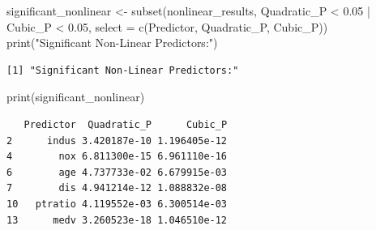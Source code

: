 \documentclass[
]{article}
\newenvironment{Shaded}{\begin{snugshade}}{\end{snugshade}}
\newcommand{\AttributeTok}[1]{\textcolor[rgb]{0.40,0.45,0.13}{#1}}
\newcommand{\ConstantTok}[1]{\textcolor[rgb]{0.56,0.35,0.01}{#1}}
\newcommand{\ControlFlowTok}[1]{\textcolor[rgb]{0.00,0.23,0.31}{#1}}
\newcommand{\DecValTok}[1]{\textcolor[rgb]{0.68,0.00,0.00}{#1}}
\newcommand{\FloatTok}[1]{\textcolor[rgb]{0.68,0.00,0.00}{#1}}
\newcommand{\FunctionTok}[1]{\textcolor[rgb]{0.28,0.35,0.67}{#1}}
\newcommand{\NormalTok}[1]{\textcolor[rgb]{0.00,0.23,0.31}{#1}}
\newcommand{\OtherTok}[1]{\textcolor[rgb]{0.00,0.23,0.31}{#1}}
\newcommand{\SpecialCharTok}[1]{\textcolor[rgb]{0.37,0.37,0.37}{#1}}
\newcommand{\StringTok}[1]{\textcolor[rgb]{0.13,0.47,0.30}{#1}}
\begin{document}
\begin{Shaded}
\begin{Highlighting}[]
\NormalTok{significant\_nonlinear }\OtherTok{\textless{}{-}} \FunctionTok{subset}\NormalTok{(nonlinear\_results, Quadratic\_P }\SpecialCharTok{\textless{}} \FloatTok{0.05} \SpecialCharTok{|}\NormalTok{ Cubic\_P }\SpecialCharTok{\textless{}} \FloatTok{0.05}\NormalTok{, }\AttributeTok{select =} \FunctionTok{c}\NormalTok{(Predictor, Quadratic\_P, Cubic\_P))}
\FunctionTok{print}\NormalTok{(}\StringTok{"Significant Non{-}Linear Predictors:"}\NormalTok{)}
\end{Highlighting}
\end{Shaded}

\begin{verbatim}
[1] "Significant Non-Linear Predictors:"
\end{verbatim}

\begin{Shaded}
\begin{Highlighting}[]
\FunctionTok{print}\NormalTok{(significant\_nonlinear)}
\end{Highlighting}
\end{Shaded}

\begin{verbatim}
   Predictor  Quadratic_P      Cubic_P
2      indus 3.420187e-10 1.196405e-12
4        nox 6.811300e-15 6.961110e-16
6        age 4.737733e-02 6.679915e-03
7        dis 4.941214e-12 1.088832e-08
10   ptratio 4.119552e-03 6.300514e-03
13      medv 3.260523e-18 1.046510e-12
\end{verbatim}

\begin{Shaded}
\end{Shaded}
\end{document}

